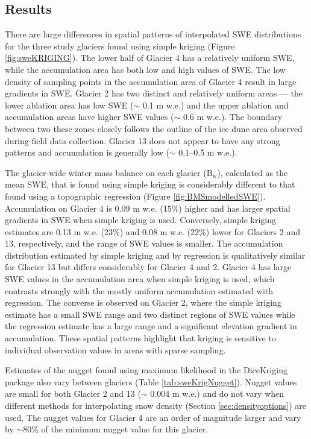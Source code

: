 \documentclass[12pt]{article}
\begin{document}
\subsection{Results}

There are large differences in spatial patterns of interpolated SWE distributions for the three study glaciers found using simple kriging (Figure \ref{fig:sweKRIGING}). The lower half of Glacier 4 has a relatively uniform SWE, while the accumulation area has both low and high values of SWE. The low density of sampling points in the accumulation area of Glacier 4 result in large gradients in SWE. Glacier 2 has two distinct and relatively uniform areas --- the lower ablation area has low SWE ($\sim$ 0.1 m w.e.) and the upper ablation and accumulation areas have higher SWE values ($\sim$ 0.6 m w.e.). The boundary between two these zones closely follows the outline of the ice dune area observed during field data collection. Glacier 13 does not appear to have any strong patterns and accumulation is generally low ($\sim$ 0.1--0.5 m w.e.). 

The glacier-wide winter mass balance on each glacier ($\mathrm{B_w}$), calculated as the mean SWE, that is found using simple kriging is considerably different to that found using a topographic regression (Figure \ref{fig:BMSmodelledSWE}). Accumulation on Glacier 4 is 0.09 m w.e. (15\%) higher and has larger spatial gradients in SWE when simple kriging is used. Conversely, simple kriging estimates are 0.13 m w.e. (23\%) and 0.08 m w.e. (22\%) lower for Glaciers 2 and 13, respectively, and the range of SWE values is smaller. The accumulation distribution estimated by simple kriging and by regression is qualitatively similar for Glacier 13 but differs considerably for Glacier 4 and 2. Glacier 4 has large SWE values in the accumulation area when simple kriging is used, which contrasts strongly with the mostly uniform accumulation estimated with regression. The converse is observed on Glacier 2, where the simple kriging estimate has a small SWE range and two distinct regions of SWE values while the regression estimate has a large range and a significant elevation gradient in accumulation. These spatial patterns highlight that kriging is sensitive to individual observation values in areas with sparse sampling. 

Estimates of the nugget found using maximum likelihood in the DiceKriging package also vary between glaciers (Table \ref{tab:sweKrigNugget}). Nugget values are small for both Glacier 2 and 13 ($\sim$ 0.004 m w.e.) and do not vary when different methods for interpolating snow density (Section \ref{sec:densityoptions}) are used. The nugget values for Glacier 4 are an order of magnitude larger and vary by $\sim$80\% of the minimum nugget value for this glacier. 
\end{document}
